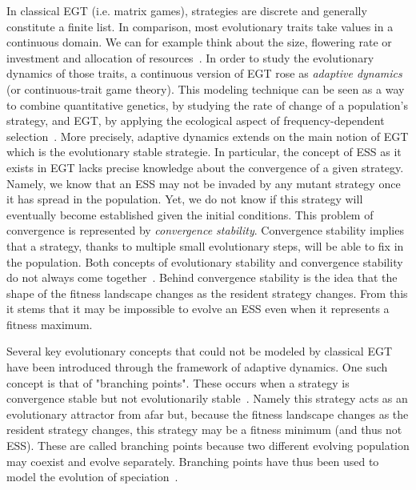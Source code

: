             In classical EGT (i.e. matrix games), strategies are discrete and generally constitute a finite list. In comparison, most evolutionary traits take values in a continuous domain. We can for example think about the size, flowering rate or investment and allocation of resources~\parencite{McGill2007}. In order to study the evolutionary dynamics of those traits, a continuous version of EGT rose as \emph{adaptive dynamics} (or continuous-trait game theory). This modeling technique can be seen as a way to combine quantitative genetics, by studying the rate of change of a population's strategy, and EGT, by applying the ecological aspect of frequency-dependent selection~\parencite{Geritz1998, McGill2007}. More precisely, adaptive dynamics extends on the main notion of EGT which is the evolutionary stable strategie. In particular, the concept of ESS as it exists in EGT lacks precise knowledge about the convergence of a given strategy. Namely, we know that an ESS may not be invaded by any mutant strategy once it has spread in the population. Yet, we do not know if this strategy will eventually become established given the initial conditions. This problem of convergence is represented by \emph{convergence stability}. Convergence stability implies that a strategy, thanks to multiple small evolutionary steps, will be able to fix in the population. Both concepts of evolutionary stability and convergence stability do not always come together~\parencite{Eshel1981, Eshel1983}. Behind convergence stability is the idea that the shape of the fitness landscape changes as the resident strategy changes. From this it stems that it may be impossible to evolve an ESS even when it represents a fitness maximum.

            Several key evolutionary concepts that could not be modeled by classical EGT have been introduced through the framework of adaptive dynamics. One such concept is that of "branching points". These occurs when a strategy is convergence stable but not evolutionarily stable~\parencite{Geritz1998}. Namely this strategy acts as an evolutionary attractor from afar but, because the fitness landscape changes as the resident strategy changes, this strategy may be a fitness minimum (and thus not ESS). These are called branching points because two different evolving population may coexist and evolve separately. Branching points have thus been used to model the evolution of speciation~\parencite{Geritz2004}. 

